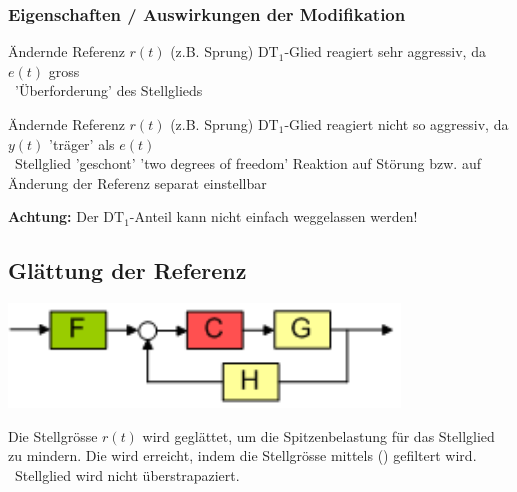 \subsubsection{Eigenschaften / Auswirkungen der Modifikation}

\begin{minipage}[t]{0.48\columnwidth}
    \raggedright
    \begin{center}
        \textbf{}
    \end{center}

    \begin{outline}
        \1 Ändernde Referenz $r(t)$ (z.B. Sprung)
            \2 $\text{DT}_1$-Glied reagiert sehr aggressiv, da $e(t)$ gross \\
                \textrightarrow\ 'Überforderung' des Stellglieds
    \end{outline}

\end{minipage}
\hfill
\begin{minipage}[t]{0.48\columnwidth}
    \raggedright
    \begin{center}
        \textbf{}
    \end{center}

    \begin{outline}
        \1 Ändernde Referenz $r(t)$ (z.B. Sprung)
            \2 $\text{DT}_1$-Glied reagiert nicht so aggressiv, da $y(t)$ 'träger' als $e(t)$ \\
                \textrightarrow\  Stellglied 'geschont'
        \1 'two degrees of freedom'
            \2 Reaktion auf Störung bzw. auf Änderung der Referenz separat einstellbar
    \end{outline}
\end{minipage}

\textbf{Achtung:} Der $\text{DT}_1$-Anteil kann nicht einfach weggelassen werden! 


\subsection{Glättung der Referenz}

\begin{minipage}[c]{0.3\columnwidth}
    \includegraphics[width=\columnwidth]{images/filterung_stellgroesse.png}
\end{minipage}
\hfill
\begin{minipage}[c]{0.68\columnwidth}
    Die Stellgrösse $r(t)$ wird geglättet, um die Spitzenbelastung für das Stellglied zu mindern. Die wird erreicht, indem die 
    Stellgrösse mittels () gefiltert wird. \textrightarrow\ Stellglied wird nicht überstrapaziert.
\end{minipage}



